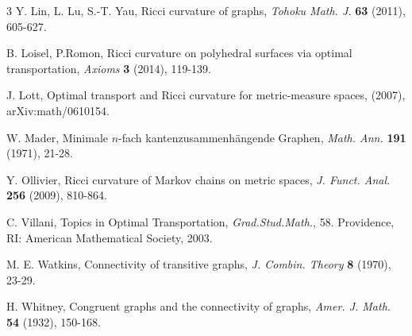 \documentclass[10pt,a4paper]{article}
\theoremstyle{definition}
\theoremstyle{definition}
\theoremstyle{nonumber}
\begin{document}
\begin{thebibliography}{3}
Y. Lin, L. Lu, S.-T. Yau, Ricci curvature of graphs, \emph{Tohoku Math. J.} \textbf{63} (2011), 605-627.

B. Loisel, P.Romon, Ricci curvature on polyhedral surfaces via optimal transportation, \emph{Axioms} \textbf{3} (2014), 119-139.

J. Lott, Optimal transport and Ricci curvature for metric-measure spaces, (2007), arXiv:math/0610154.

 W. Mader, Minimale $n$-fach kantenzusammenhängende Graphen, \emph{Math. Ann.} \textbf{191} (1971), 21-28.

Y. Ollivier, Ricci curvature of Markov chains on metric spaces, \emph{J. Funct. Anal.} \textbf{256} (2009), 810-864.

C. Villani, Topics in Optimal Transportation, \emph{Grad.Stud.Math.}, 58. Providence, RI: American Mathematical Society, 2003.

 M. E. Watkins, Connectivity of transitive graphs, \emph{J. Combin. Theory} \textbf{8} (1970), 23-29.

 H. Whitney, Congruent graphs and the connectivity of graphs, \emph{Amer. J. Math.} \textbf{54} (1932), 150-168.
\end{thebibliography}
\end{document}
